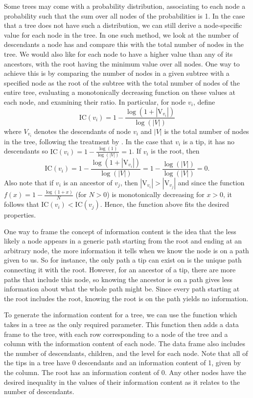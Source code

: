 \documentclass[article]{jss}
\newcommand{\fct}[1]{\code{#1()}}
\begin{document}
Some trees may come with a probability distribution, associating to each node a probability such that the sum over all nodes of the probabilities is 1. In the case that a tree does not have such a distribution, we can still derive a node-specific value for each node in the tree. In one such method, we look at the number of descendants a node has and compare this with the total number of nodes in the tree. We would also like for each node to have a higher value than any of its ancestors, with the root having the minimum value over all nodes. One way to achieve this is by comparing the number of nodes in a given subtree with a specified node as the root of the subtree with the total number of nodes of the entire tree, evaluating a monotonically decreasing function on these values at each node, and examining their ratio. In particular, for node $v_i$, define $$\textrm{IC}(v_i) = 1 - \frac{\log(1 + |\textrm{V}_{v_i}|)}{\log(|V|)}$$ where $V_{v_i}$ denotes the descendants of node $v_i$ and $|V|$ is the total number of nodes in the tree, following the treatment by \cite{seco2004intrinsic}. In the case that $v_i$ is a tip, it has no descendants so $\textrm{IC}(v_i) = 1 - \frac{\log(1)}{\log(|V|)} = 1$. If $v_i$ is the root, then $$\textrm{IC}(v_i) = 1 - \frac{\log(1 + |\textrm{V}_{v_i}|)}{\log(|V|)} = 1 - \frac{\log(|V|)}{\log(|V|)} = 0.$$ Also note that if $v_i$ is an ancestor of $v_j$, then $|\textrm{V}_{v_i}| > |\textrm{V}_{v_j}|$ and since the function $f(x) = 1 - \frac{\log(1 + x)}{N}$ (for $N > 0$) is monotonically decreasing for $x > 0$, it follows that $\textrm{IC}(v_i) < \textrm{IC}(v_j)$. Hence, the function above fits the desired properties.

One way to frame the concept of information content is the idea that the less likely a node appears in a generic path starting from the root and ending at an arbitrary node, the more information it tells when we know the node is on a path given to us. So for instance, the only path a tip can exist on is the unique path connecting it with the root. However, for an ancestor of a tip, there are more paths that include this node, so knowing the ancestor is on a path gives less information about what the whole path might be. Since every path starting at the root includes the root, knowing the root is on the path yields no information.

To generate the information content for a tree, we can use the  \fct{attach\_information\_content} function which takes in a tree as the only required parameter. This function then adds a data frame to the tree, with each row corresponding to a node of the tree and a column with the information content of each node. The data frame also includes the number of descendants, children, and the level for each node. Note that all of the tips in a tree have 0 descendants and an information content of 1, given by the  column. The root has an information content of 0. Any other nodes have the desired inequality in the values of their information content as it relates to the number of descendants.
\end{document}
